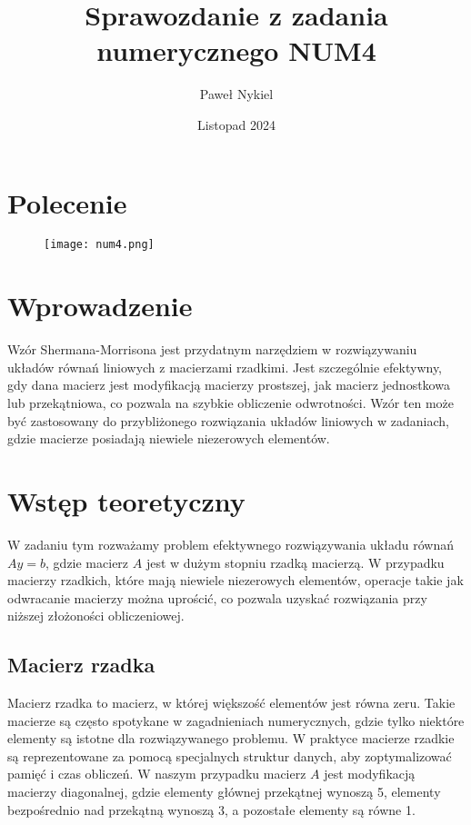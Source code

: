 \documentclass[a4paper,12pt]{article}
\begin{document}
\title{Sprawozdanie z zadania numerycznego NUM4}
\author{Paweł Nykiel}
\date{Listopad 2024}

\maketitle

\section{Polecenie}

\begin{figure}[h]
    \centering
    \texttt{[image: num4.png]} %
    \label{fig:example-image}
\end{figure}



\section{Wprowadzenie}
Wzór Shermana-Morrisona jest przydatnym narzędziem w rozwiązywaniu układów równań liniowych z macierzami rzadkimi. Jest szczególnie efektywny, gdy dana macierz jest modyfikacją macierzy prostszej, jak macierz jednostkowa lub przekątniowa, co pozwala na szybkie obliczenie odwrotności. Wzór ten może być zastosowany do przybliżonego rozwiązania układów liniowych w zadaniach, gdzie macierze posiadają niewiele niezerowych elementów.




\section{Wstęp teoretyczny}

W zadaniu tym rozważamy problem efektywnego rozwiązywania układu równań \( Ay = b \), gdzie macierz \( A \) jest w dużym stopniu rzadką macierzą. W przypadku macierzy rzadkich, które mają niewiele niezerowych elementów, operacje takie jak odwracanie macierzy można uprościć, co pozwala uzyskać rozwiązania przy niższej złożoności obliczeniowej.

\subsection{Macierz rzadka}
Macierz rzadka to macierz, w której większość elementów jest równa zeru. Takie macierze są często spotykane w zagadnieniach numerycznych, gdzie tylko niektóre elementy są istotne dla rozwiązywanego problemu. W praktyce macierze rzadkie są reprezentowane za pomocą specjalnych struktur danych, aby zoptymalizować pamięć i czas obliczeń. W naszym przypadku macierz \( A \) jest modyfikacją macierzy diagonalnej, gdzie elementy głównej przekątnej wynoszą 5, elementy bezpośrednio nad przekątną wynoszą 3, a pozostałe elementy są równe 1. 
\end{document}
